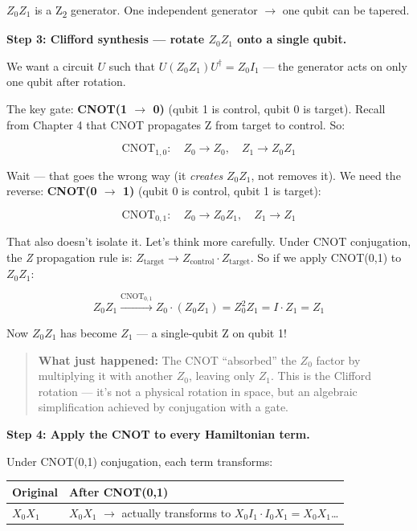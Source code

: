 \documentclass[
  11pt,
  oneside]{book}
\begin{document}
\(Z_0 Z_1\) is a Z\textsubscript{2} generator. One independent generator $\rightarrow$ one qubit can
be tapered.

\textbf{Step 3: Clifford synthesis --- rotate \(Z_0 Z_1\) onto a single
qubit.}

We want a circuit \(U\) such that \(U (Z_0 Z_1) U^\dagger = Z_0 I_1\)
--- the generator acts on only one qubit after rotation.

The key gate: \textbf{CNOT(1 $\rightarrow$ 0)} (qubit 1 is control, qubit 0 is
target). Recall from Chapter 4 that CNOT propagates Z from target to
control. So:

\[\text{CNOT}_{1,0}:\quad Z_0 \to Z_0, \quad Z_1 \to Z_0 Z_1\]

Wait --- that goes the wrong way (it \emph{creates} \(Z_0 Z_1\), not
removes it). We need the reverse: \textbf{CNOT(0 $\rightarrow$ 1)} (qubit 0 is
control, qubit 1 is target):

\[\text{CNOT}_{0,1}:\quad Z_0 \to Z_0 Z_1, \quad Z_1 \to Z_1\]

That also doesn't isolate it. Let's think more carefully. Under CNOT
conjugation, the \emph{Z} propagation rule is:
\(Z_{\text{target}} \to Z_{\text{control}} \cdot Z_{\text{target}}\). So
if we apply CNOT(0,1) to \(Z_0 Z_1\):

\[Z_0 Z_1 \xrightarrow{\text{CNOT}_{0,1}} Z_0 \cdot (Z_0 Z_1) = Z_0^2 Z_1 = I \cdot Z_1 = Z_1\]

Now \(Z_0 Z_1\) has become \(Z_1\) --- a single-qubit Z on qubit 1!

\begin{quote}
\textbf{What just happened:} The CNOT ``absorbed'' the \(Z_0\) factor by
multiplying it with another \(Z_0\), leaving only \(Z_1\). This is the
Clifford rotation --- it's not a physical rotation in space, but an
algebraic simplification achieved by conjugation with a gate.
\end{quote}

\textbf{Step 4: Apply the CNOT to every Hamiltonian term.}

Under CNOT(0,1) conjugation, each term transforms:

\begin{longtable}[]{@{}
  >{\centering\arraybackslash}p{}
  >{\centering\arraybackslash}p{}@{}}
\toprule\noalign{}
\begin{minipage}[b]{\linewidth}\centering
Original
\end{minipage} & \begin{minipage}[b]{\linewidth}\centering
After CNOT(0,1)
\end{minipage} \\
\midrule\noalign{}
\endhead
\bottomrule\noalign{}
\endlastfoot
\(X_0 X_1\) & \(X_0 X_1\) $\rightarrow$ actually transforms to
\(X_0 I_1 \cdot I_0 X_1 = X_0 X_1\)\ldots{} \\
\end{longtable}
\end{document}
